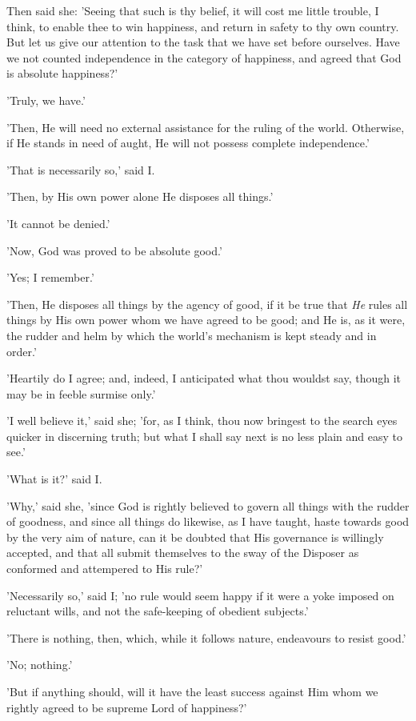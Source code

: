 Then said she: 'Seeing that such is thy belief, it will cost me little
trouble, I think, to enable thee to win happiness, and return in safety
to thy own country. But let us give our attention to the task that we
have set before ourselves. Have we not counted independence in the
category of happiness, and agreed that God is absolute happiness?'

'Truly, we have.'

'Then, He will need no external assistance for the ruling of the world.
Otherwise, if He stands in need of aught, He will not possess complete
independence.'

'That is necessarily so,' said I.

'Then, by His own power alone He disposes all things.'

'It cannot be denied.'

'Now, God was proved to be absolute good.'

'Yes; I remember.'

'Then, He disposes all things by the agency of good, if it be true that
\emph{He} rules all things by His own power whom we have agreed to be good;
and He is, as it were, the rudder and helm by which the world's
mechanism is kept steady and in order.'

'Heartily do I agree; and, indeed, I anticipated what thou wouldst say,
though it may be in feeble surmise only.'

'I well believe it,' said she; 'for, as I think, thou now bringest to
the search eyes quicker in discerning truth; but what I shall say next
is no less plain and easy to see.'

'What is it?' said I.

'Why,' said she, 'since God is rightly believed to govern all things
with the rudder of goodness, and since all things do likewise, as I have
taught, haste towards good by the very aim of nature, can it be doubted
that His governance is willingly accepted, and that all submit
themselves to the sway of the Disposer as conformed and attempered to
His rule?'

'Necessarily so,' said I; 'no rule would seem happy if it were a yoke
imposed on reluctant wills, and not the safe-keeping of obedient
subjects.'

'There is nothing, then, which, while it follows nature, endeavours to
resist good.'

'No; nothing.'

'But if anything should, will it have the least success against Him whom
we rightly agreed to be supreme Lord of happiness?'

